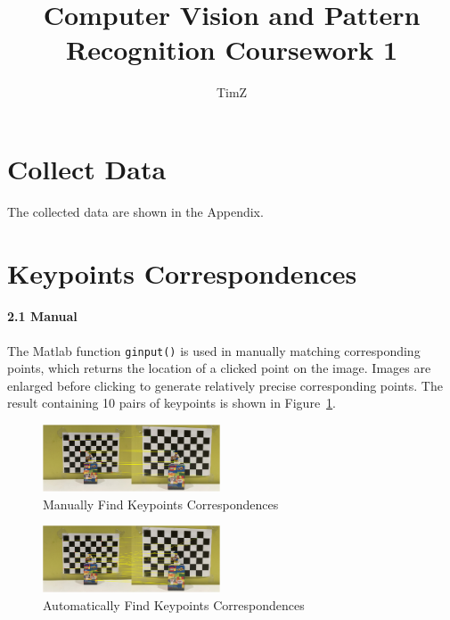 \documentclass[10pt,twocolumn,letterpaper]{article}
\begin{document}
\title{Computer Vision and Pattern Recognition Coursework 1}
\author{TimZ}
\maketitle




\section{Collect Data}
\noindent The collected data are shown in the Appendix.




\section{Keypoints Correspondences}
\paragraph{2.1 Manual}
The Matlab function \texttt{\textcolor[RGB]{28,172,0}{ginput()}} is used in manually matching corresponding points, which returns the location of a clicked point on the image. Images are enlarged before clicking to generate relatively precise corresponding points. The result containing 10 pairs of keypoints is shown in Figure~\ref{fig:1}.
\begin{figure}[h]
\begin{center}  
   \includegraphics[width=0.47\textwidth]{2.1Manual}
\end{center}
   \caption{Manually Find Keypoints Correspondences}
\label{fig:1}
\end{figure}

\begin{figure}[h]
\begin{center}
   \includegraphics[width=0.47\textwidth]{2.2Automatic}
\end{center}
   \caption{Automatically Find Keypoints Correspondences}
\label{fig:2}
\end{figure}
\end{document}

